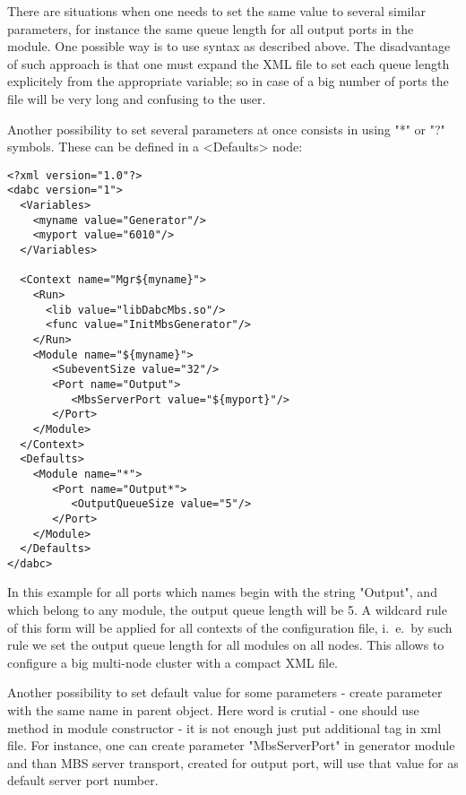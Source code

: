 There are situations when one needs to set the same value to several similar parameters,
for instance the same queue length for all output ports in the module. 
One possible way is to use syntax as described above. 
The disadvantage of such approach is that one must expand the XML file
to set each queue length explicitely from the appropriate variable;
so in case of a big number of ports the file will be very long and 
confusing to the user.

Another possibility to set several parameters at once 
consists in  using "*" or "?" symbols.
These can be defined in a  <Defaults> node: 

\begin{small}
\begin{verbatim}
<?xml version="1.0"?>
<dabc version="1">
  <Variables>
    <myname value="Generator"/> 
    <myport value="6010"/> 
  </Variables>

  <Context name="Mgr${myname}">
    <Run>
      <lib value="libDabcMbs.so"/>
      <func value="InitMbsGenerator"/>
    </Run>
    <Module name="${myname}">
       <SubeventSize value="32"/>
       <Port name="Output">
          <MbsServerPort value="${myport}"/>
       </Port>
    </Module>
  </Context>
  <Defaults>
    <Module name="*">
       <Port name="Output*">
          <OutputQueueSize value="5"/>
       </Port>
    </Module>
  </Defaults>
</dabc>
\end{verbatim}
\end{small}

In this example for all ports which names begin with the string "Output", 
and which belong to any module, the output queue length will be 5. 
A wildcard rule of this form will be applied for 
all contexts of the configuration file, 
i.~e.\ by such rule we set the output queue length for all modules on all nodes. 
This allows to configure a big multi-node cluster with
a compact XML file.

Another possibility to set default value for some parameters - create
parameter with the same name in parent object. Here word  
is crutial - one should use  method in module constructor - 
it is not enough just put additional tag in xml file. For instance, one can
create parameter "MbsServerPort" in generator module and than 
MBS server transport, created for output port, will use that value for 
as default server port number.  




